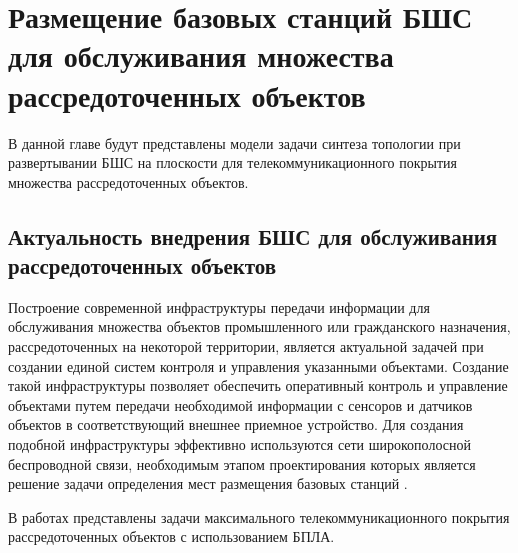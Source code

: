 \chapter{Размещение базовых станций БШС для обслуживания множества рассредоточенных объектов}\label{ch:ch3}
 
В данной главе будут представлены модели задачи синтеза топологии при развертывании БШС на плоскости для телекоммуникационного покрытия множества рассредоточенных объектов. 

\section{Актуальность внедрения БШС для обслуживания рассредоточенных объектов}

Построение современной инфраструктуры передачи информации для обслуживания множества объектов промышленного или гражданского назначения, рассредоточенных на некоторой территории, является актуальной задачей при создании единой систем контроля и управления указанными объектами.  Создание такой инфраструктуры позволяет обеспечить оперативный контроль и управление объектами путем передачи необходимой информации с сенсоров и датчиков объектов в соответствующий внешнее приемное устройство. Для создания подобной инфраструктуры эффективно используются сети широкополосной беспроводной связи, необходимым этапом проектирования которых является решение задачи определения мест размещения базовых станций \cite{VishnevskyBook}.

В работах \cite{Cicek2019, Medvedeva2020, Khayrov2020} представлены задачи максимального телекоммуникационного покрытия рассредоточенных объектов с использованием БПЛА.



